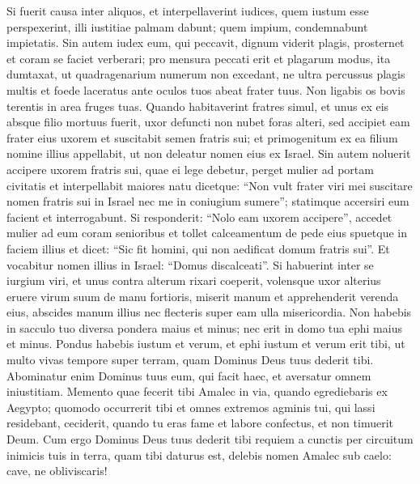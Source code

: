 \begin{biblechapter} 
\verse Si fuerit causa inter aliquos, et interpellaverint iudices, quem iustum esse perspexerint, illi iustitiae palmam dabunt; quem impium, condemnabunt impietatis. 
\verse Sin autem iudex eum, qui peccavit, dignum viderit plagis, prosternet et coram se faciet verberari; pro mensura peccati erit et plagarum modus, 
\verse ita dumtaxat, ut quadragenarium numerum non excedant, ne ultra percussus plagis multis et foede laceratus ante oculos tuos abeat frater tuus. 
\verse Non ligabis os bovis terentis in area fruges tuas. 
\verse Quando habitaverint fratres simul, et unus ex eis absque filio mortuus fuerit, uxor defuncti non nubet foras alteri, sed accipiet eam frater eius uxorem et suscitabit semen fratris sui; 
\verse et primogenitum ex ea filium nomine illius appellabit, ut non deleatur nomen eius ex Israel. 
\verse Sin autem noluerit accipere uxorem fratris sui, quae ei lege debetur, perget mulier ad portam civitatis et interpellabit maiores natu dicetque: “Non vult frater viri mei suscitare nomen fratris sui in Israel nec me in coniugium sumere”; 
\verse statimque accersiri eum facient et interrogabunt. Si responderit: “Nolo eam uxorem accipere”, 
\verse accedet mulier ad eum coram senioribus et tollet calceamentum de pede eius spuetque in faciem illius et dicet: “Sic fit homini, qui non aedificat domum fratris sui”. 
\verse Et vocabitur nomen illius in Israel: “Domus discalceati”. 
\verse Si habuerint inter se iurgium viri, et unus contra alterum rixari coeperit, volensque uxor alterius eruere virum suum de manu fortioris, miserit manum et apprehenderit verenda eius, 
\verse abscides manum illius nec flecteris super eam ulla misericordia. 
\verse Non habebis in sacculo tuo diversa pondera maius et minus; 
\verse nec erit in domo tua ephi maius et minus. 
\verse Pondus habebis iustum et verum, et ephi iustum et verum erit tibi, ut multo vivas tempore super terram, quam Dominus Deus tuus dederit tibi. 
\verse Abominatur enim Dominus tuus eum, qui facit haec, et aversatur omnem iniustitiam. 
\verse Memento quae fecerit tibi Amalec in via, quando egrediebaris ex Aegypto;  
\verse quomodo occurrerit tibi et omnes extremos agminis tui, qui lassi residebant, ceciderit, quando tu eras fame et labore confectus, et non timuerit Deum. 
\verse Cum ergo Dominus Deus tuus dederit tibi requiem a cunctis per circuitum inimicis tuis in terra, quam tibi daturus est, delebis nomen Amalec sub caelo: cave, ne obliviscaris! 
\end{biblechapter}

